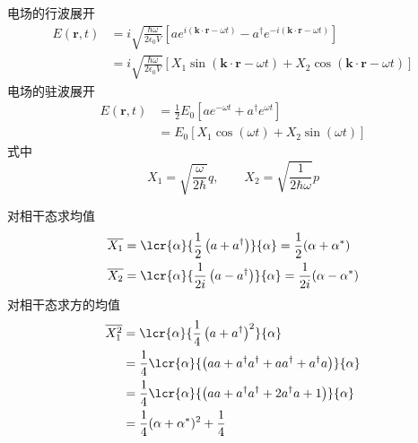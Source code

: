 \begin{frame} 
 \frametitle{}
      电场的行波展开
      \[ \begin{aligned}
          E(\mathbf{r},t)  &= i  \sqrt{\frac{\hbar \omega}{2 \epsilon_0 V}} [a e^{i(\mathbf{k}\cdot \mathbf{r} -\omega t) }- 
          a^{\dagger} e^{-i(\mathbf{k}\cdot \mathbf{r}-\omega t)}]\\
          &=i  \sqrt{\frac{\hbar \omega}{2 \epsilon_0 V}} [X_1 \sin(\mathbf{k}\cdot \mathbf{r}-\omega t) + X_2 \cos(\mathbf{k}\cdot \mathbf{r}-\omega t)] 
      \end{aligned}\] 
      电场的驻波展开
      \[ \begin{aligned}
        E(\mathbf{r},t)  &= \frac{1}{2} E_0 [ a e^{ -\omega t}+ a^{\dagger} e^{ \omega t}] \\ 
        &= E_0 [X_1 \cos(\omega t)+ X_2 \sin(\omega t)]
      \end{aligned}\]
    式中
    \[ X_1 = \sqrt{\frac{\omega}{2\hbar}}q, \qquad X_2 = \sqrt{\frac{1}{2\hbar\omega}}p\]
\end{frame}
\begin{frame} 
    对相干态求均值
    \[
    \begin{aligned}
        \overline{ X_1}  &= \lcr{\alpha}{\frac{1}{2}\left(a+a^{\dagger}\right)}{\alpha} = \frac{1}{2}(\alpha+\alpha^*) \\
        \overline{X_2}  &= \lcr{\alpha}{\frac{1}{2i}\left(a-a^{\dagger}\right)}{\alpha} = \frac{1}{2i}(\alpha-\alpha^*) \\
    \end{aligned}\]
    对相干态求方的均值
    \[
    \begin{aligned}
      \overline{X^2 _1} &= \lcr{\alpha}{\frac{1}{4}\left(a+a^{\dagger}\right)^2} {\alpha}  \\ 
      &= \frac{1}{4}\lcr{\alpha}{\left(aa+a^{\dagger}a^{\dagger}+ aa^{\dagger} + a^{\dagger}a\right)} {\alpha}  \\
      &= \frac{1}{4}\lcr{\alpha}{\left(aa+a^{\dagger}a^{\dagger}+ 2a^{\dagger}a + 1 \right)} {\alpha} \\
      &= \frac{1}{4}(\alpha + \alpha^*)^2+ \frac{1}{4}
    \end{aligned}   
    \]
\end{frame}

